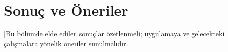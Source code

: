 \section{Sonuç ve Öneriler}

[Bu bölümde elde edilen sonuçlar özetlenmeli; uygulamaya ve gelecekteki çalışmalara yönelik öneriler sunulmalıdır.]
